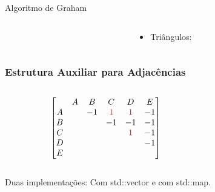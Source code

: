 \documentclass[aspectratio=169,usenames,dvipsnames]{beamer}
\begin{document}
\begin{frame}{Algoritmo de Graham}
  \begin{columns}
    \begin{column}{0.5\textwidth}
      
    \end{column}
    \begin{column}{0.5\textwidth}
        \begin{itemize}
          \item Triângulos:
        \begin{itemize}
        \end{itemize}
        \end{itemize}
    \end{column}
  \end{columns}
\end{frame}

\begin{frame}
  \frametitle{Estrutura Auxiliar para Adjacências}
  
  \begin{columns}
   \begin{column}{0.5\textwidth}
  \[
  \begin{bmatrix}
      & A & B & C & D & E \\
  A &   & -1 & {\color{red} 1} &  {\color{red} 1}& -1 \\
  B &   &    & -1  & -1  & -1 \\
  C &   &    &    & {\color{red} 1}  & -1 \\
  D &   &    &    &    & -1 \\
  E &   &    &    &    &   \\
  \end{bmatrix}
  \]
   \end{column} 
   \begin{column}{0.5\textwidth}
    
    
   \end{column} 
  \end{columns}

  Duas implementações: Com std::vector e com std::map.
  
 \end{frame}
\end{document}
